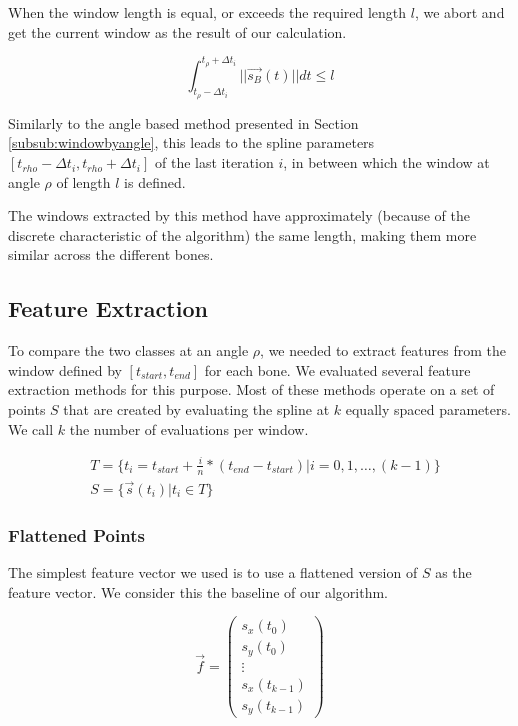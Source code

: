 \documentclass[pdftex,12pt,a4paper]{report}
\begin{document}
When the window length is equal, or exceeds the required length $l$, we abort and get the current
window as the result of our calculation.

\begin{equation}
\int_{t_\rho - \Delta t_i}^{t_\rho + \Delta t_i} ||\vec{s_B}(t)|| dt \leq l
\end{equation}

Similarly to the angle based method presented in Section \ref{subsub:windowbyangle}, this leads to the spline parameters $[t_{rho}-\Delta t_i, t_{rho}+\Delta t_i]$ of the last iteration $i$, in between which the window at angle $\rho$ of length $l$ is defined.

The windows extracted by this method have approximately (because of the discrete
characteristic of the algorithm) the same length, making them more similar across
the different bones.

\subsection{Feature Extraction}
\label{sub:featureextraction}

To compare the two classes at an angle $\rho$, we needed to extract features from the
window defined by $[t_{start}, t_{end}]$ for each bone. We evaluated several feature
extraction methods for this purpose. Most of these methods operate on a set of points
$S$ that are created by evaluating the spline at $k$ equally spaced parameters. We call $k$ the number of evaluations per window.

\begin{equation}
\begin{split}
& T = \{ t_i=t_{start} + \frac{i}{n} * (t_{end}-t_{start}) | i=0, 1, \dots, (k-1) \} \\
& S = \{ \vec{s}(t_i) | t_i \in T \}
\end{split}
\end{equation}  

\subsubsection{Flattened Points}
\label{subsub:features-flattened}

The simplest feature vector we used is to use a flattened version of $S$ as the feature
vector. We consider this the baseline of our algorithm.

\begin{equation}
\vec{f} = \left( \begin{array}{c}
s_x(t_0) \\
s_y(t_0) \\
\vdots \\
s_x(t_{k-1}) \\
s_y(t_{k-1})
\end{array} \right)
\end{equation}
\end{document}
